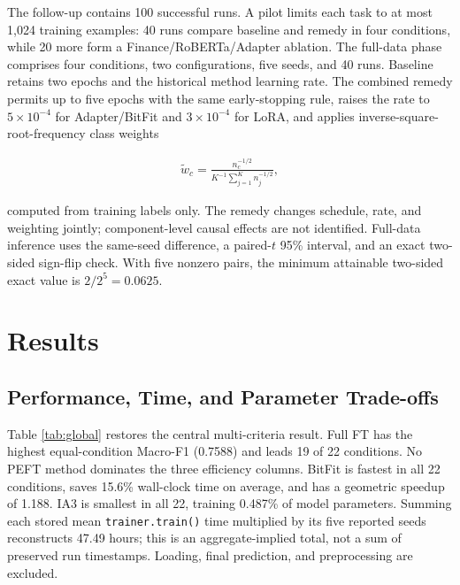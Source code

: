 \documentclass{SPC}
\begin{document}
The follow-up contains 100 successful runs. A pilot limits each task to at most 1,024 training examples: 40 runs compare baseline and remedy in four conditions, while 20 more form a Finance/RoBERTa/Adapter ablation. The full-data phase comprises four conditions, two configurations, five seeds, and 40 runs. Baseline retains two epochs and the historical method learning rate. The combined remedy permits up to five epochs with the same early-stopping rule, raises the rate to $5\times10^{-4}$ for Adapter/BitFit and $3\times10^{-4}$ for LoRA, and applies inverse-square-root-frequency class weights

\begin{align}
\widetilde{w}_c = \frac{n_c^{-1/2}}{K^{-1}\sum_{j=1}^{K} n_j^{-1/2}},
\label{eq:weighting}
\end{align}

computed from training labels only. The remedy changes schedule, rate, and weighting jointly; component-level causal effects are not identified. Full-data inference uses the same-seed difference, a paired-$t$ 95\% interval, and an exact two-sided sign-flip check. With five nonzero pairs, the minimum attainable two-sided exact value is $2/2^5=0.0625$.


\section{Results}

\subsection{Performance, Time, and Parameter Trade-offs}

Table \ref{tab:global} restores the central multi-criteria result. Full FT has the highest equal-condition Macro-F1 (0.7588) and leads 19 of 22 conditions. No PEFT method dominates the three efficiency columns. BitFit is fastest in all 22 conditions, saves 15.6\% wall-clock time on average, and has a geometric speedup of 1.188. IA3 is smallest in all 22, training 0.487\% of model parameters. Summing each stored mean \texttt{trainer.train()} time multiplied by its five reported seeds reconstructs 47.49 hours; this is an aggregate-implied total, not a sum of preserved run timestamps. Loading, final prediction, and preprocessing are excluded.
\end{document}
